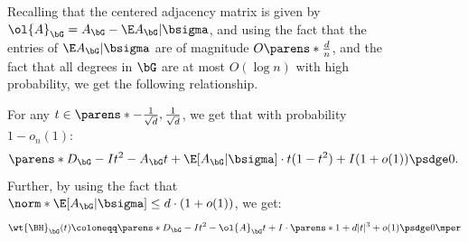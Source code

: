 \documentclass[11pt,letterpaper]{article}
\begin{document}
\begin{figure}
    Recalling that the centered adjacency matrix is given by $\ol{A}_{\bG} = A_{\bG} - \E A_{\bG} | \bsigma$, and using the fact that the entries of $\E A_{\bG}|\bsigma$ are of magnitude $O\parens*{\frac{d}{n}}$, and the fact that all degrees in $\bG$ are at most $O(\log n)$ with high probability, we get the following relationship.
    \begin{corollary}   \label{cor:bethe-bounds}
        For any $t\in\parens*{-\frac{1}{\sqrt{d}}, \frac{1}{\sqrt{d}}}$, we get that with probability $1-o_n(1)$:
        \[
            \parens*{D_{\bG}-I}t^2 - A_{\bG}t + \E[A_{\bG}|\bsigma] \cdot t(1-t^2) + I (1 + o(1)) \psdge 0.
        \]
        Further, by using the fact that $\norm*{\E[A_{\bG}|\bsigma}] \le d\cdot(1+o(1))$, we get:
        \[
            \wt{\BH}_{\bG}(t) \coloneqq \parens*{D_{\bG}-I}t^2 - \ol{A}_{\bG} t + I \cdot\parens*{1 + d|t|^3 + o(1)} \psdge 0\mper
        \]
    \end{corollary}


\end{figure}
\end{document}
